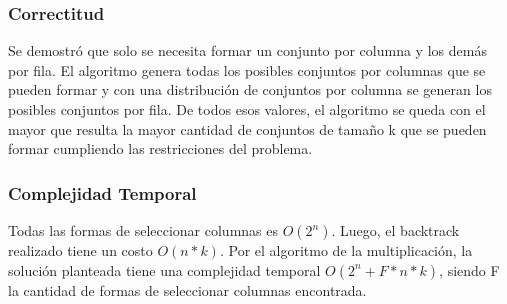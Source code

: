 \documentclass{article}
\begin{document}
\subsubsection{Correctitud}
Se demostró que solo se necesita formar un conjunto por columna y los demás por fila. El algoritmo genera todas los posibles conjuntos por columnas que se pueden formar y con una distribución de conjuntos por columna se generan los posibles conjuntos por fila. De todos esos valores, el algoritmo se queda con el mayor que resulta la mayor cantidad de conjuntos de tamaño k que se pueden formar cumpliendo las restricciones del problema.

\subsubsection{Complejidad Temporal}

Todas las formas de seleccionar columnas es $O(2^n)$. Luego, el backtrack realizado tiene un costo $O(n*k)$. Por el algoritmo de la multiplicación, la solución planteada tiene una complejidad temporal $O(2^n + F*n*k)$, siendo F la cantidad de formas de seleccionar columnas encontrada.
\end{document}
